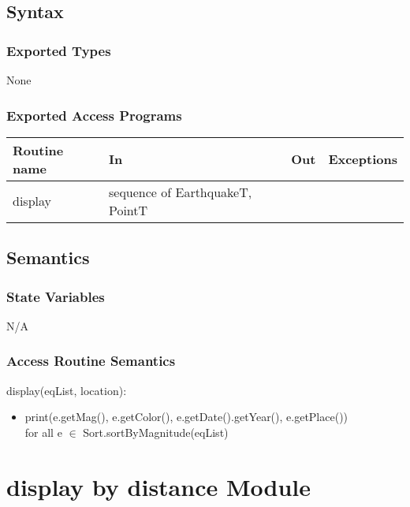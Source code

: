 \documentclass[12pt]{article}
\begin{document}
\subsection* {Syntax}

\subsubsection* {Exported Types}

None

\subsubsection* {Exported Access Programs}

\begin{tabular}{| l | l | l | p{6cm} |}
\hline
\textbf{Routine name} & \textbf{In} & \textbf{Out} & \textbf{Exceptions}\\
\hline
display & sequence of EarthquakeT, PointT &  &  ~\\
\hline
\end{tabular}

\subsection* {Semantics}

\subsubsection* {State Variables}

N/A


\subsubsection* {Access Routine Semantics}

\noindent display(eqList, location):
\begin{itemize}
\item print(e.getMag(), e.getColor(), e.getDate().getYear(), e.getPlace())\\  
for all e $\in$ Sort.sortByMagnitude(eqList)
\end{itemize}





\newpage

\section* {display by distance Module}
\end{document}
